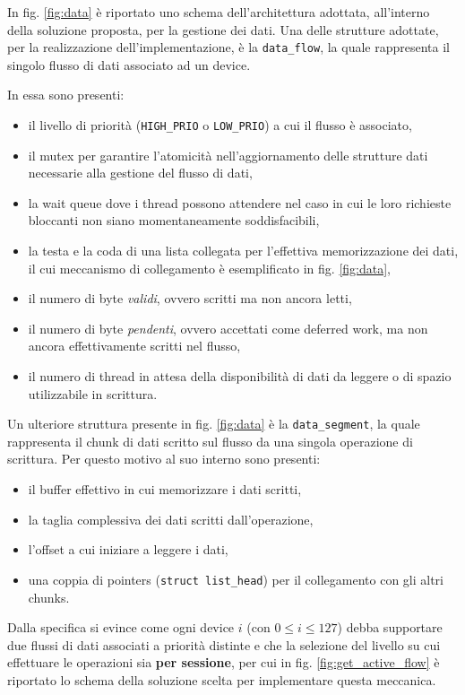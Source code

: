 \documentclass{article}
\begin{document}
In fig. \ref{fig:data} è riportato uno schema dell'architettura adottata, all'interno della soluzione proposta, per la gestione dei dati. Una delle strutture adottate, per la realizzazione dell'implementazione, è la \texttt{data\_flow}, la quale rappresenta il singolo flusso di dati associato ad un device.

In essa sono presenti:
\begin{itemize}
        \item il livello di priorità (\texttt{HIGH\_PRIO} o \texttt{LOW\_PRIO}) a cui il flusso è associato,
        \item il mutex per garantire l'atomicità nell'aggiornamento delle strutture dati necessarie alla gestione del flusso di dati,
        \item la wait queue dove i thread possono attendere nel caso in cui le loro richieste bloccanti non siano momentaneamente soddisfacibili,
        \item la testa e la coda di una lista collegata per l'effettiva memorizzazione dei dati, il cui meccanismo di collegamento è esemplificato in fig. \ref{fig:data},
        \item il numero di byte \textit{validi}, ovvero scritti ma non ancora letti,
        \item il numero di byte \textit{pendenti}, ovvero accettati come deferred work, ma non ancora effettivamente scritti nel flusso,
        \item il numero di thread in attesa della disponibilità di dati da leggere o di spazio utilizzabile in scrittura.
\end{itemize}

Un ulteriore struttura presente in fig. \ref{fig:data} è la \texttt{data\_segment}, la quale rappresenta il chunk di dati scritto sul flusso da una singola operazione di scrittura. Per questo motivo al suo interno sono presenti:
\begin{itemize}
        \item il buffer effettivo in cui memorizzare i dati scritti,
        \item la taglia complessiva dei dati scritti dall'operazione,
        \item l'offset a cui iniziare a leggere i dati,
        \item una coppia di pointers (\texttt{struct list\_head}) per il collegamento con gli altri chunks.
\end{itemize}

Dalla specifica si evince come ogni device $i$ (con $0\leq i \leq 127$) debba supportare due flussi di dati associati a priorità distinte e che la selezione del livello su cui effettuare le operazioni sia \textbf{per sessione}, per cui in fig. \ref{fig:get_active_flow} è riportato lo schema della soluzione scelta per implementare questa meccanica.
\end{document}
